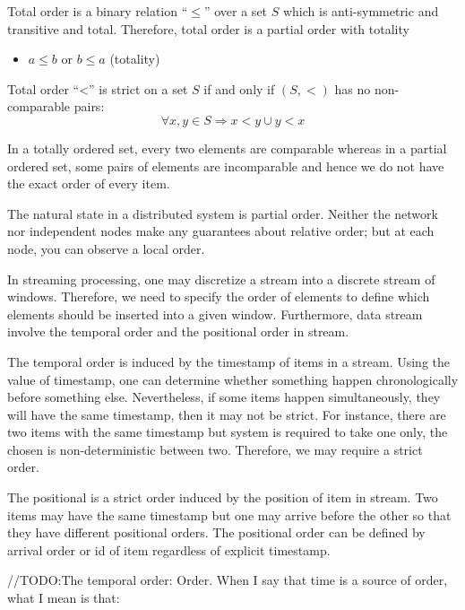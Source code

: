 \begin{defi}
 Total order is a binary relation ``$\leq$'' over a set $S$ which is anti-symmetric and transitive and total. Therefore, total order is a partial order with totality
 
 \begin{itemize}
	 \item $a \leq b$ or $b \leq a$  (totality)
\end{itemize}
\end{defi}

Total order ``<'' is strict on a set $S$ if and only if $(S, <)$ has no non-comparable pairs:
\begin{equation}
 \forall x, y \in S \Rightarrow  x < y \cup y < x 
\end{equation} 

In a totally ordered set, every two elements are comparable whereas in a partial ordered set, some pairs of elements are incomparable and hence we do not have the exact order of every item.

The natural state in a distributed system is partial order. Neither the network nor independent nodes make any guarantees about relative order; but at each node, you can observe a local order.

In streaming processing, one may discretize a stream into a discrete stream of windows. Therefore, we need to specify the order of elements to define which elements should be inserted into a given window. Furthermore, data stream involve the temporal order and the positional order \citep{Petit:2012} in stream. 

The temporal order is induced by the timestamp of items in a stream. Using the value of timestamp, one can determine whether something happen chronologically before something else. Nevertheless, if some items happen simultaneously, they will have the same timestamp, then it may not be strict. For instance, there are two items with the same timestamp but system is required to take one only, the chosen is non-deterministic between two. Therefore, we may require a strict order.

The positional is a strict order induced by the position of item in stream. Two items  may have the same timestamp but one may arrive before the other so that they have different positional orders. The positional order can be defined by arrival order or id of item regardless of explicit timestamp. 


//TODO:The temporal order: Order. When I say that time is a source of order, what I mean is that:

